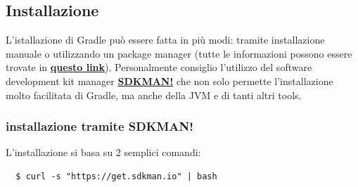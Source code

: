 \documentclass{article}
\begin{document}
\begin{flushleft}
\subsection{Installazione}
L'istallazione di Gradle può essere fatta in più modi: tramite installazione manuale o utilizzando un package manager (tutte le informazioni possono essere trovate in \textbf{\href{https://gradle.org/install/}{questo link}}). Personalmente consiglio l'utilizzo del software development kit manager \textbf{\href{http://sdkman.io/}{SDKMAN!}} che non solo permette l'installazione molto facilitata di Gradle, ma anche della JVM e di tanti altri tools.

\subsubsection{installazione tramite SDKMAN!}
L'installazione si basa su 2 semplici comandi:
\begin{verbatim}
  $ curl -s "https://get.sdkman.io" | bash
  

\end{verbatim}
\end{flushleft}
\end{document}
